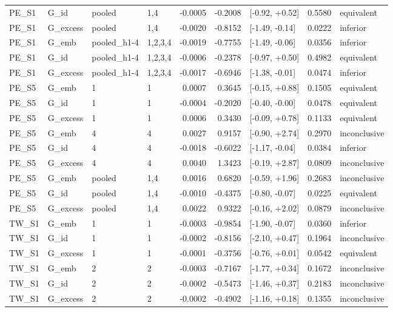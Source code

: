 \begin{tabular}{llllrrlrl}
PE\_S1 & G\_id & pooled & 1,4 & -0.0005 & -0.2008 & [-0.92, +0.52] & 0.5580 & equivalent \\
PE\_S1 & G\_excess & pooled & 1,4 & -0.0020 & -0.8152 & [-1.49, -0.14] & 0.0222 & inferior \\
PE\_S1 & G\_emb & pooled\_h1-4 & 1,2,3,4 & -0.0019 & -0.7755 & [-1.49, -0.06] & 0.0356 & inferior \\
PE\_S1 & G\_id & pooled\_h1-4 & 1,2,3,4 & -0.0006 & -0.2378 & [-0.97, +0.50] & 0.4982 & equivalent \\
PE\_S1 & G\_excess & pooled\_h1-4 & 1,2,3,4 & -0.0017 & -0.6946 & [-1.38, -0.01] & 0.0474 & inferior \\
PE\_S5 & G\_emb & 1 & 1 & 0.0007 & 0.3645 & [-0.15, +0.88] & 0.1505 & equivalent \\
PE\_S5 & G\_id & 1 & 1 & -0.0004 & -0.2020 & [-0.40, -0.00] & 0.0478 & equivalent \\
PE\_S5 & G\_excess & 1 & 1 & 0.0006 & 0.3430 & [-0.09, +0.78] & 0.1133 & equivalent \\
PE\_S5 & G\_emb & 4 & 4 & 0.0027 & 0.9157 & [-0.90, +2.74] & 0.2970 & inconclusive \\
PE\_S5 & G\_id & 4 & 4 & -0.0018 & -0.6022 & [-1.17, -0.04] & 0.0384 & inferior \\
PE\_S5 & G\_excess & 4 & 4 & 0.0040 & 1.3423 & [-0.19, +2.87] & 0.0809 & inconclusive \\
PE\_S5 & G\_emb & pooled & 1,4 & 0.0016 & 0.6820 & [-0.59, +1.96] & 0.2683 & inconclusive \\
PE\_S5 & G\_id & pooled & 1,4 & -0.0010 & -0.4375 & [-0.80, -0.07] & 0.0225 & equivalent \\
PE\_S5 & G\_excess & pooled & 1,4 & 0.0022 & 0.9322 & [-0.16, +2.02] & 0.0879 & inconclusive \\
TW\_S1 & G\_emb & 1 & 1 & -0.0003 & -0.9854 & [-1.90, -0.07] & 0.0360 & inferior \\
TW\_S1 & G\_id & 1 & 1 & -0.0002 & -0.8156 & [-2.10, +0.47] & 0.1964 & inconclusive \\
TW\_S1 & G\_excess & 1 & 1 & -0.0001 & -0.3756 & [-0.76, +0.01] & 0.0542 & equivalent \\
TW\_S1 & G\_emb & 2 & 2 & -0.0003 & -0.7167 & [-1.77, +0.34] & 0.1672 & inconclusive \\
TW\_S1 & G\_id & 2 & 2 & -0.0002 & -0.5473 & [-1.46, +0.37] & 0.2183 & inconclusive \\
TW\_S1 & G\_excess & 2 & 2 & -0.0002 & -0.4902 & [-1.16, +0.18] & 0.1355 & inconclusive \\

\end{tabular}
